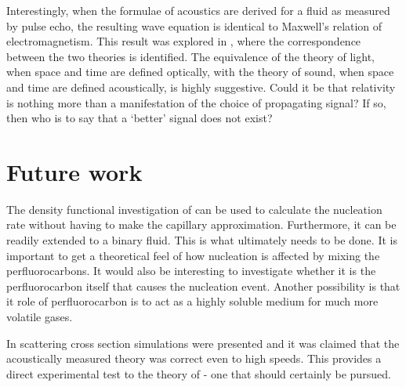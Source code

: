 Interestingly, when the formulae of acoustics are derived for a fluid as measured by pulse echo,
the resulting wave equation is identical to Maxwell's relation of electromagnetism.
This  result was explored  in ,
where the  correspondence between the two theories is identified.
The equivalence of the theory of light, when space and time are defined optically,
with the theory of sound, when space and time are defined acoustically, 
is highly suggestive.
Could it be that relativity is nothing more than a manifestation of the choice of propagating signal?
If so, then who is to say that a `better' signal does not exist?












\section{Future work}


The density functional investigation of  can be used to calculate the nucleation rate 
without having to make the capillary approximation\cite{Oxtoby1988}.
Furthermore, it can be readily extended to a binary fluid\cite{Talanquer1994, Talanquer2001}.
This is what ultimately needs to be done.
It is important to get a theoretical feel of how nucleation is affected by mixing the perfluorocarbons.
It would also be interesting to investigate whether it is the perfluorocarbon itself that causes the nucleation event.
Another possibility is that it role of  perfluorocarbon is to act as a highly soluble medium for much more volatile gases.

In  scattering cross section simulations were presented
and it was claimed that the acoustically measured theory was correct even to high speeds.
This provides a direct experimental test to the theory of  - 
one that should certainly be pursued.

